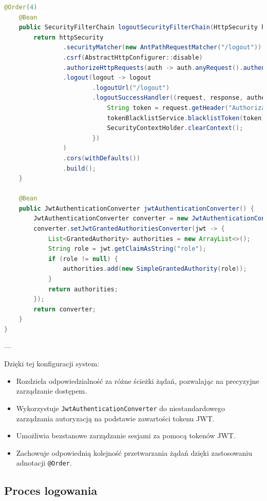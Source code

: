 \begin{lstlisting}[language=Java, caption=Pełna konfiguracja łańcucha filtrów bezpieczeństwa]
    @Order(4)
    @Bean
    public SecurityFilterChain logoutSecurityFilterChain(HttpSecurity httpSecurity) throws Exception {
        return httpSecurity
                .securityMatcher(new AntPathRequestMatcher("/logout"))
                .csrf(AbstractHttpConfigurer::disable)
                .authorizeHttpRequests(auth -> auth.anyRequest().authenticated())
                .logout(logout -> logout
                        .logoutUrl("/logout")
                        .logoutSuccessHandler((request, response, authentication) -> {
                            String token = request.getHeader("Authorization").replace("Bearer ", "");
                            tokenBlacklistService.blacklistToken(token);
                            SecurityContextHolder.clearContext();
                        })
                )
                .cors(withDefaults())
                .build();
    }

    @Bean
    public JwtAuthenticationConverter jwtAuthenticationConverter() {
        JwtAuthenticationConverter converter = new JwtAuthenticationConverter();
        converter.setJwtGrantedAuthoritiesConverter(jwt -> {
            List<GrantedAuthority> authorities = new ArrayList<>();
            String role = jwt.getClaimAsString("role");
            if (role != null) {
                authorities.add(new SimpleGrantedAuthority(role));
            }
            return authorities;
        });
        return converter;
    }
}
\end{lstlisting}

---

Dzięki tej konfiguracji system:
\begin{itemize}
    \item Rozdziela odpowiedzialność za różne ścieżki żądań, pozwalając na precyzyjne zarządzanie dostępem.
    \item Wykorzystuje \texttt{JwtAuthenticationConverter} do niestandardowego zarządzania autoryzacją na podstawie zawartości tokenu JWT.
    \item Umożliwia bezstanowe zarządzanie sesjami za pomocą tokenów JWT.
    \item Zachowuje odpowiednią kolejność przetwarzania żądań dzięki zastosowaniu adnotacji \texttt{@Order}.
\end{itemize}

\subsection{Proces logowania}

